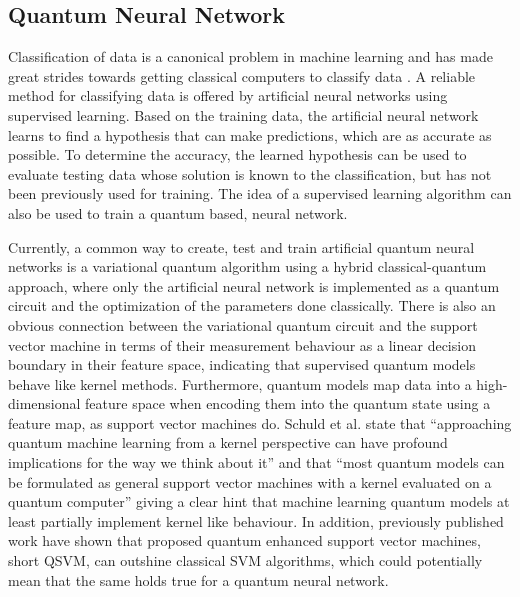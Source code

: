 \subsection{Quantum Neural Network}
Classification of data is a canonical problem in machine learning and has made great strides towards getting classical computers to classify data \cite{Killoran_2019,ClassificationWithQNN}. A reliable method for classifying data is offered by artificial neural networks using supervised learning. Based on the training data, the artificial neural network learns to find a hypothesis that can make predictions, which are as accurate as possible. To determine the accuracy, the learned hypothesis can be used to evaluate testing data whose solution is known to the classification, but has not been previously used for training. The idea of a supervised learning algorithm can also be used to train a quantum based, neural network.\par
Currently, a common way to create, test and train artificial quantum neural networks is a variational quantum algorithm using a hybrid classical-quantum approach, where only the artificial neural network is implemented as a quantum circuit and the optimization of the parameters done classically\cite{Cerezo_2021,mccleanBarrenPlateausQuantum2018,Zhao_2021,schuld_SQMLmodelsAreKernelMethods,sim_expressibility_2019,Abbas_2021}. There is also an obvious connection between the variational quantum circuit and the support vector machine in terms of their measurement behaviour as a linear decision boundary in their feature space, indicating that supervised quantum models behave like kernel methods. Furthermore, quantum models map data into a high-dimensional feature space when encoding them into the quantum state using a feature map, as support vector machines do\cite{havlicekSupervisedLearningQuantum2019,ThomsenComparingQNNs_QSVM}. Schuld et al.\cite{schuld_SQMLmodelsAreKernelMethods} state that “approaching quantum machine learning from a kernel perspective can have profound implications for the way we think about it” and that “most quantum models can be formulated as general support vector machines with a kernel evaluated on a quantum computer” giving a clear hint that machine learning quantum models at least partially implement kernel like behaviour. In addition, previously published work have shown that proposed quantum enhanced support vector machines, short QSVM, can outshine classical SVM algorithms, which could potentially mean that the same holds true for a quantum neural network\cite{havensteinComparisonsPerformanceQuantum2019,yangSupportVectorMachines2019}.\par
